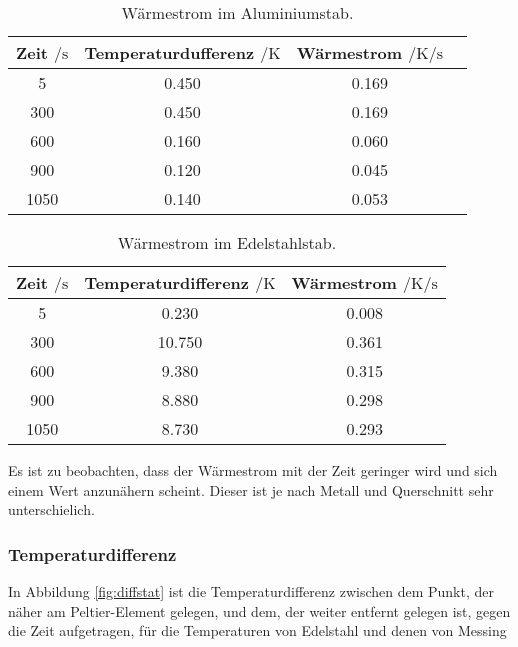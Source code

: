   \begin{table}
    \centering
    \caption{Wärmestrom im Aluminiumstab.}
    \label{tabl:stroma}
    \begin{tabular}{c c c c}
      \toprule
      Zeit $\mathbin{/} \si{\s}$ & Temperaturdufferenz $\mathbin{/} \si{\kelvin}$& Wärmestrom $\mathbin{/} \si{\kelvin\per\s}$\\
      \midrule
      5 & 0.450 & 0.169\\
      300 & 0.450 & 0.169\\
      600 & 0.160 & 0.060\\
      900 & 0.120 & 0.045\\
      1050 & 0.140 & 0.053\\
      \bottomrule
    \end{tabular}
  \end{table}

  \begin{table}
    \centering
    \caption{Wärmestrom im Edelstahlstab.}
    \label{tab:strome}
    \begin{tabular}{c c c}
      \toprule
      Zeit $\mathbin{/} \si{\s}$ & Temperaturdifferenz $\mathbin{/} \si{\kelvin}$& Wärmestrom $\mathbin{/} \si{\kelvin\per\s}$\\
      \midrule
      5 & 0.230& 0.008\\
      300 & 10.750 & 0.361 \\
      600 & 9.380 & 0.315\\
      900 & 8.880 & 0.298\\%
      1050 & 8.730 & 0.293\\%
      \bottomrule
    \end{tabular}
  \end{table}
  \FloatBarrier
  \noindent Es ist zu beobachten, dass der Wärmestrom mit der Zeit geringer wird und sich einem Wert anzunähern scheint. Dieser ist je nach Metall und Querschnitt 
  sehr unterschielich. %

  \subsubsection{Temperaturdifferenz}
  In Abbildung \ref{fig:diffstat} ist die Temperaturdifferenz zwischen dem Punkt, der näher am Peltier-Element gelegen, und dem, der weiter
  entfernt gelegen ist, gegen die Zeit aufgetragen, für die Temperaturen von Edelstahl und denen von Messing

